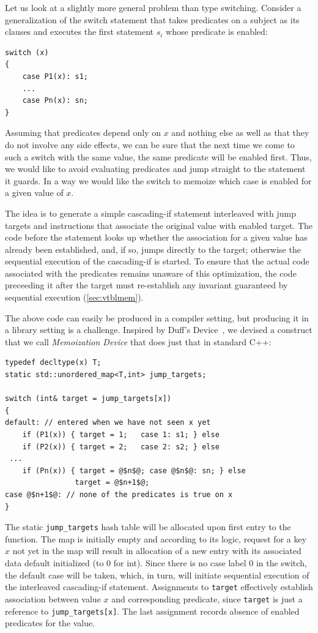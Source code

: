 \documentclass[preprint]{sigplanconf}
\makeatletter
\DeclareRobustCommand{\code}[1]{{\lstinline[breaklines=false,escapechar=@]{#1}}}
\makeatother
\begin{document}
Let us look at a slightly more general problem than type switching. Consider a 
generalization of the switch statement that takes predicates on a subject as its 
clauses and executes the first statement $s_i$ whose predicate is enabled: 

\begin{lstlisting}
switch (x)
{
    case P1(x): s1;
    ...
    case Pn(x): sn;
}
\end{lstlisting}

\noindent
Assuming that predicates depend only on $x$ and nothing else as well as that 
they do not involve any side effects, we can be sure that the next time we come 
to such a switch with the same value, the same predicate will be enabled 
first. Thus, we would like to avoid evaluating predicates and jump straight to 
the statement it guards. In a way we would like the switch to  memoize which 
case is enabled for a given value of $x$.

The idea is to generate a simple cascading-if statement interleaved with jump 
targets and instructions that associate the original value with enabled target. 
The code before the statement looks up whether the association for a given value 
has already been established, and, if so, jumps directly to the target; otherwise 
the sequential execution of the cascading-if is started. To ensure 
that the actual code associated with the predicates remains unaware of this 
optimization, the code preceeding it after the target must re-establish any 
invariant guaranteed by sequential execution (\textsection\ref{sec:vtblmem}).

The above code can easily be produced in a compiler setting, but producing it in 
a library setting is a challenge. Inspired by Duff's Device~\cite{Duff}, 
we devised a construct that we call \emph{Memoization Device} that does just 
that in standard C++:

\begin{lstlisting}
typedef decltype(x) T;
static std::unordered_map<T,int> jump_targets;

switch (int& target = jump_targets[x])
{
default: // entered when we have not seen x yet
    if (P1(x)) { target = 1;   case 1: s1; } else 
    if (P2(x)) { target = 2;   case 2: s2; } else
 ...
    if (Pn(x)) { target = @$n$@; case @$n$@: sn; } else
                target = @$n+1$@;
case @$n+1$@: // none of the predicates is true on x
}
\end{lstlisting}

\noindent
The static \code{jump_targets} hash table will be allocated upon first entry 
to the function. The map is initially empty and according to its logic, 
request for a key $x$ not yet in the map will result in allocation of a 
new entry with its associated data default initialized (to 0 for int). Since 
there is no case label 0 in the switch, the default case will be taken, which, in 
turn, will initiate sequential execution of the interleaved cascading-if 
statement. Assignments to \code{target} effectively establish association 
between value $x$ and corresponding predicate, since \code{target} is just a 
reference to \code{jump_targets[x]}. The last assignment records absence of 
enabled predicates for the value.
\end{document}
